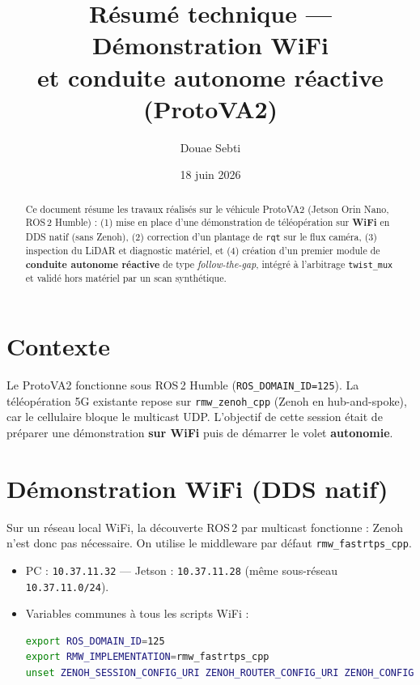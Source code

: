 \documentclass[a4paper,11pt]{article}
\title{\textbf{Résumé technique — Démonstration WiFi \\ et conduite autonome réactive (ProtoVA2)}}
\author{Douae Sebti}
\date{18 juin 2026}
\begin{document}
\maketitle

\begin{abstract}
\noindent Ce document résume les travaux réalisés sur le véhicule ProtoVA2
(Jetson Orin Nano, ROS\,2 Humble) : (1) mise en place d'une démonstration de
téléopération sur \textbf{WiFi} en DDS natif (sans Zenoh), (2) correction d'un
plantage de \texttt{rqt} sur le flux caméra, (3) inspection du LiDAR et
diagnostic matériel, et (4) création d'un premier module de \textbf{conduite
autonome réactive} de type \emph{follow-the-gap}, intégré à l'arbitrage
\texttt{twist\_mux} et validé hors matériel par un scan synthétique.
\end{abstract}

\section{Contexte}
Le ProtoVA2 fonctionne sous ROS\,2 Humble (\texttt{ROS\_DOMAIN\_ID=125}). La
téléopération 5G existante repose sur \texttt{rmw\_zenoh\_cpp} (Zenoh en
hub-and-spoke), car le cellulaire bloque le multicast UDP. L'objectif de cette
session était de préparer une démonstration \textbf{sur WiFi} puis de démarrer
le volet \textbf{autonomie}.

\section{Démonstration WiFi (DDS natif)}
Sur un réseau local WiFi, la découverte ROS\,2 par multicast fonctionne : Zenoh
n'est donc pas nécessaire. On utilise le middleware par défaut
\texttt{rmw\_fastrtps\_cpp}.

\begin{itemize}[leftmargin=1.4em]
  \item PC : \texttt{10.37.11.32} \quad — \quad Jetson : \texttt{10.37.11.28}
        (même sous-réseau \texttt{10.37.11.0/24}).
  \item Variables communes à tous les scripts WiFi :
\begin{lstlisting}[language=bash]
export ROS_DOMAIN_ID=125
export RMW_IMPLEMENTATION=rmw_fastrtps_cpp
unset ZENOH_SESSION_CONFIG_URI ZENOH_ROUTER_CONFIG_URI ZENOH_CONFIG
\end{lstlisting}
\end{itemize}
\end{document}
